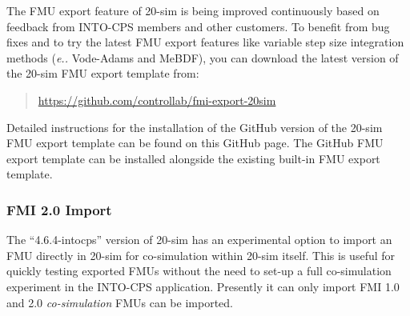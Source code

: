 The FMU export feature of {20-sim} is being improved continuously based on feedback from INTO-CPS members and other customers. 
%
To benefit from bug fixes and to try the latest FMU export features like variable step size integration methods (\emph{e.\@g.\@} Vode-Adams and MeBDF), you can download the latest version of the {20-sim} FMU export template from:
%
%
%
\begin{quote}
  \url{https://github.com/controllab/fmi-export-20sim}
\end{quote}
%
%
%
Detailed instructions for the installation of the GitHub version of the {20-sim} FMU export template can be found on this GitHub page.
The GitHub FMU export template can be installed alongside the existing built-in FMU export template.
%
%
%

\subsubsection{FMI 2.0 Import}\label{sec:simulators:20sim:fmuimport}
The ``{4.6.4}-intocps'' version of {20-sim} has an experimental option to import an FMU directly in {20-sim} for co-simulation within {20-sim} itself.
This is useful for quickly testing exported FMUs without the need to set-up a full co-simulation experiment in the INTO-CPS application.
Presently it can only import FMI 1.0 and 2.0 \textit{co-simulation} FMUs can be imported.

